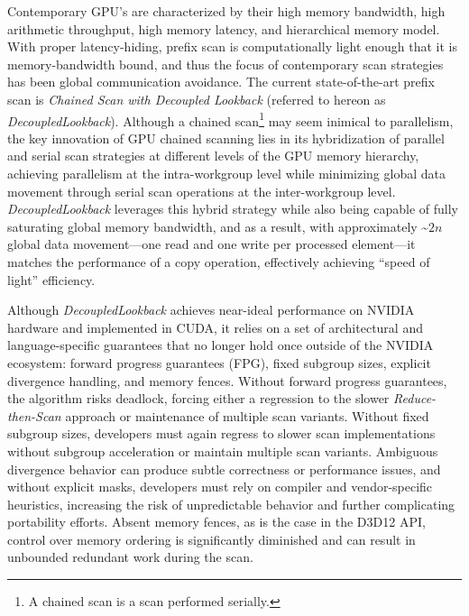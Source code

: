 \documentclass[sigconf]{acmart}
\begin{document}
Contemporary GPU's are characterized by their high memory bandwidth, high arithmetic throughput, high memory latency, and hierarchical memory model. With proper latency-hiding, prefix scan is computationally light enough that it is memory-bandwidth bound, and thus the focus of contemporary scan strategies has been global communication avoidance. The current state-of-the-art prefix scan is \textit{Chained Scan with Decoupled Lookback}\cite{Merrill2016} (referred to hereon as \textit{DecoupledLookback}). Although a chained scan\footnote{A chained scan is a scan performed serially.} may seem inimical to parallelism, the key innovation of GPU chained scanning lies in its hybridization of parallel and serial scan strategies at different levels of the GPU memory hierarchy, achieving parallelism at the intra-workgroup level while minimizing global data movement through serial scan operations at the inter-workgroup level. \textit{DecoupledLookback} leverages this hybrid strategy while also being capable of fully saturating global memory bandwidth, and as a result, with approximately \textasciitilde$2n$ global data movement—one read and one write per processed element—it matches the performance of a copy operation, effectively achieving “speed of light” efficiency.

 Although \textit{DecoupledLookback} achieves near-ideal performance on NVIDIA hardware and implemented in CUDA, it relies on a set of architectural and language-specific guarantees that no longer hold once outside of the NVIDIA ecosystem: forward progress guarantees (FPG), fixed subgroup sizes, explicit divergence handling, and memory fences. Without forward progress guarantees, the algorithm risks deadlock, forcing either a regression to the slower \textit{Reduce-then-Scan} approach or maintenance of multiple scan variants. Without fixed subgroup sizes, developers must again regress to slower scan implementations without subgroup acceleration or maintain multiple scan variants. Ambiguous divergence behavior can produce subtle correctness or performance issues, and without explicit masks, developers must rely on compiler and vendor-specific heuristics, increasing the risk of unpredictable behavior and further complicating portability efforts. Absent memory fences, as is the case in the D3D12 API, control over memory ordering is significantly diminished and can result in unbounded redundant work during the scan.
 
\end{document}
